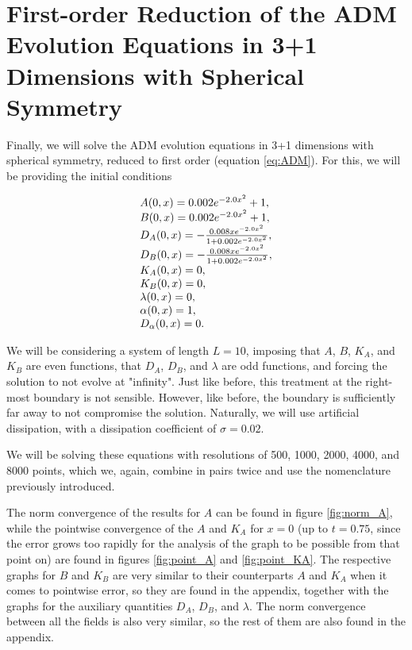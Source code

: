 \section{First-order Reduction of the ADM Evolution Equations in 3+1 Dimensions with Spherical Symmetry}
\label{sec:adm}

Finally, we will solve the ADM evolution equations in 3+1 dimensions with spherical symmetry, reduced to first order (equation \eqref{eq:ADM}). For this, we will be providing the initial conditions

\begin{align}
    \begin{array}{@{}l@{}}
        A(0,x) = 0.002 e^{-2.0 x^2}+1,
        \\
        B(0,x) = 0.002 e^{-2.0 x^2}+1,
        \\
        D_A(0,x) = - \frac{0.008 x e^{-2.0 x^2}}{1 + 0.002 e^{-2.0 x^2}},
        \\
        D_B(0,x) = - \frac{0.008 x e^{-2.0 x^2}}{1 + 0.002 e^{-2.0 x^2}},
        \\
        K_A(0,x) = 0,
        \\
        K_B(0,x) = 0,
        \\
        \lambda(0,x) = 0,
        \\
        \alpha(0,x) = 1,
        \\
        D_\alpha (0,x) = 0.
    \end{array}
    \label{eq:GR_IC}
\end{align}

We will be considering a system of length $L = 10$, imposing that $A$, $B$, $K_A$, and $K_B$ are even functions, that $D_A$, $D_B$, and $\lambda$ are odd functions, and forcing the solution to not evolve at "infinity". Just like before, this treatment at the right-most boundary is not sensible. However, like before, the boundary is sufficiently far away to not compromise the solution. Naturally, we will use artificial dissipation, with a dissipation coefficient of $\sigma = 0.02$.%

We will be solving these equations with resolutions of 500, 1000, 2000, 4000, and 8000 points, which we, again, combine in pairs twice and use the nomenclature previously introduced.

The norm convergence of the results for $A$ can be found in figure \ref{fig:norm_A}, while the pointwise convergence of the $A$ and $K_A$ for $x = 0$ (up to $t = 0.75$, since the error grows too rapidly for the analysis of the graph to be possible from that point on) are found in figures \ref{fig:point_A} and \ref{fig:point_KA}. The respective graphs for $B$ and $K_B$ are very similar to their counterparts $A$ and $K_A$ when it comes to pointwise error, so they are found in the appendix, together with the graphs for the auxiliary quantities $D_A$, $D_B$, and $\lambda$. The norm convergence between all the fields is also very similar, so the rest of them are also found in the appendix.

